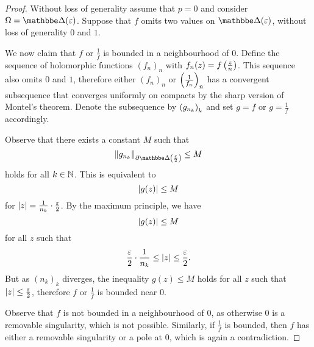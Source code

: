 \begin{proof}
Without loss of generality assume that $p = 0$ and consider
$\Omega = \dsk(\varepsilon)$. Suppose that $f$ omits two values on
$\dsk(\varepsilon)$, without loss of generality $0$ and $1$.

We now claim that $f$ or $\frac{1}{f}$ is bounded in a
neighbourhood of $0$. Define the sequence of holomorphic functions
$(f_n)_n$ with $f_n(z) = f \left(\frac{z}{n}\right)$. This sequence also
omits $0$ and $1$, therefore either $(f_n)_n$ or
$\left(\frac{1}{f_n}\right)_n$ has a convergent subsequence that converges
uniformly on compacts by the sharp version of Montel's theorem.
Denote the subsequence by $\left(g_{n_k}\right)_k$ and set $g = f$ or
$g = \frac{1}{f}$ accordingly.

Observe that there exists a constant $M$ such that
\[
\norm{g_{n_k}}_{\partial \dsk \br{\frac{\varepsilon}{2}}} \leq M
\]
holds for all $k \in \mathbb{N}$. This is equivalent to
\[
\left\lvert g(z)\right\rvert \leq M
\]
for $\left\lvert z\right\rvert = \frac{1}{n_k} \cdot \frac{\varepsilon}{2}$. By the
maximum principle, we have
\[
\left\lvert g(z)\right\rvert \leq M
\]
for all $z$ such that
\[
\frac{\varepsilon}{2} \cdot \frac{1}{n_k} \leq
\left\lvert z\right\rvert \leq
\frac{\varepsilon}{2}.
\]
But as $(n_k)_k$ diverges, the inequality $g(z) \leq M$ holds for
all $z$ such that $\left\lvert z\right\rvert \leq \frac{\varepsilon}{2}$, therefore
$f$ or $\frac{1}{f}$ is bounded near $0$.

Observe that $f$ is not bounded in a neighbourhood of $0$, as
otherwise $0$ is a removable singularity, which is not possible.
Similarly, if $\frac{1}{f}$ is bounded, then $f$ has either a
removable singularity or a pole at $0$, which is again a
contradiction.
\end{proof}
